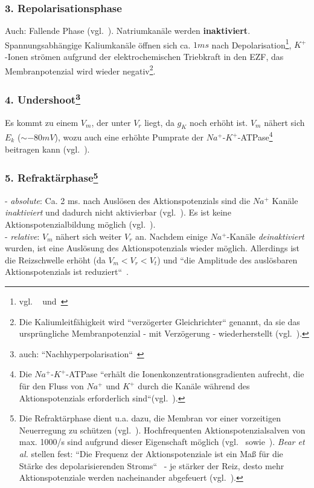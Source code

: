 \subsubsection*{3. Repolarisationsphase}
Auch: Fallende Phase (vgl.~\cite[105]{BCP18}).
Natriumkanäle werden \textbf{inaktiviert}.
Spannungsabhängige Kaliumkanäle öffnen sich ca. $1 ms$ nach Depolarisation\footnote{
    vgl. ~\cite[105]{BCP18} und~\cite[47, Tafel 2.3 (A.2)]{SD07}
}, $K^+$-Ionen strömen aufgrund der elektrochemischen Triebkraft in den EZF, das Membranpotenzial wird wieder negativ\footnote{
    Die Kaliumleitfähigkeit wird ``verzögerter Gleichrichter`` genannt, da sie das ursprüngliche Membranpotenzial - mit Verzögerung - wiederherstellt (vgl.~\cite[103]{BCP18}).
}.


\subsubsection*{4. Undershoot\footnote{
    auch: ``Nachhyperpolarisation``~\cite[46]{SD07}
}}
Es kommt zu einem $V_m$, der unter $V_r$ liegt, da $g_{K}$ noch erhöht ist. $V_m$ nähert sich $E_k$ ($\sim-80 mV$), wozu auch eine erhöhte Pumprate der $Na^+$-$K^+$-ATPase\footnote{
    Die $Na^+$-$K^+$-ATPase ``erhält die Ionenkonzentrationsgradienten aufrecht, die für den Fluss von $Na^+$ und $K^+$ durch die Kanäle während des Aktionspotenzials erforderlich sind``(vgl.~\cite[105]{BCP18}).
} beitragen kann (vgl.~\cite[46]{SD07}).


\subsubsection*{5. Refraktärphase\footnote{
    Die Refraktärphase dient u.a. dazu, die Membran vor einer vorzeitigen Neuerregung zu schützen (vgl.~\cite[76]{Jon19}).
    Hochfrequenten Aktionspotenzialsalven von max. 1000/s sind aufgrund dieser Eigenschaft möglich (vgl.~\cite[46]{SD07} sowie~\cite[89]{BCP18}).
    \textit{Bear et al.} stellen fest: ``Die Frequenz der Aktionspotenziale ist ein Maß für die Stärke des depolarisierenden Stroms``~\cite[89]{BCP18} - je stärker der Reiz, desto mehr Aktionspotenziale werden nacheinander abgefeuert (vgl.~\cite[90, Abb. 4.3]{BCP18}).
}}

- \textit{absolute}: Ca. 2 ms.
nach Auslösen des Aktionspotenzials sind die $Na^+$ Kanäle  \textit{inaktiviert} und dadurch nicht aktivierbar (vgl.~\cite[70]{FE19}).
Es ist keine Aktionspotenzialbildung möglich (vgl.~\cite[46]{SD07}).\\
- \textit{relative}: $V_m$ nähert sich weiter $V_r$ an.
Nachdem einige $Na^+$-Kanäle  \textit{deinaktiviert} wurden, ist eine Auslösung des Aktionspotenzials wieder möglich.
Allerdings ist die Reizschwelle erhöht (da $V_m < V_r < V_t$) und ``die Amplitude des auslösbaren Aktionspotenzials ist reduziert``~\cite[70]{FE19}.

